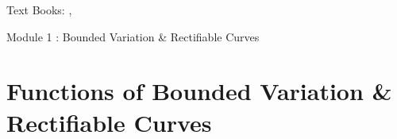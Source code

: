 Text Books: \cite{apostol}, \cite{rudin}


\def\upint{\mathchoice%
    {\mkern13mu\overline{\vphantom{\intop}\mkern7mu}\mkern-20mu}%
    {\mkern7mu\overline{\vphantom{\intop}\mkern7mu}\mkern-14mu}%
    {\mkern7mu\overline{\vphantom{\intop}\mkern7mu}\mkern-14mu}%
    {\mkern7mu\overline{\vphantom{\intop}\mkern7mu}\mkern-14mu}%
  \int}
\def\lowint{\mkern3mu\underline{\vphantom{\intop}\mkern7mu}\mkern-10mu\int}

{\Large Module 1 : Bounded Variation \& Rectifiable Curves}
\section{Functions of Bounded Variation \& Rectifiable Curves}
\setcounter{subsection}{1}
